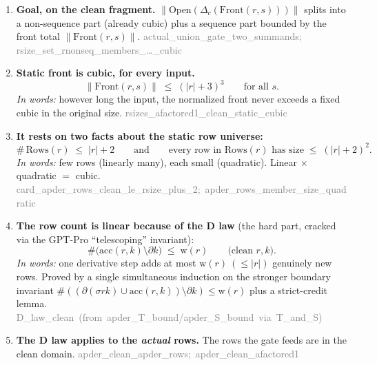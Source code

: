 \documentclass[11pt]{article}
\newcommand{\rs}[1]{\lvert #1\rvert}                  %
\newcommand{\norm}[1]{\lVert #1\rVert}                %
\newcommand{\acc}{\mathrm{acc}}                       %
\newcommand{\front}{\partial}                          %
\newcommand{\seqn}{\sigma}                             %
\newcommand{\zw}{\mathrm{w}}                           %
\newcommand{\Rows}{\mathrm{Rows}}                      %
\newcommand{\Front}{\mathrm{Front}}                    %
\newcommand{\Strong}{\Delta}                           %
\newcommand{\Open}{\mathrm{Open}}                      %
\newcommand{\done}{\textcolor{green!55!black}{\textbf{[\checkmark\ PROVEN]}}}
\newcommand{\lem}[1]{{\footnotesize\textsf{\textcolor{gray}{#1}}}}
\begin{document}
\medskip
\begin{enumerate}[leftmargin=2.2em,itemsep=6pt]

\item[\done] \textbf{Goal, on the clean fragment.}
$\norm{\Open(\Strong_c(\Front(r,s)))}$ splits into a non-sequence part
(already cubic) plus a sequence part bounded by the front total $\norm{\Front(r,s)}$.
\lem{actual\_union\_gate\_two\_summands; rsize\_set\_rnonseq\_members\_\dots\_cubic}

\item[\done] \textbf{Static front is cubic, for every input.}
\[
\norm{\Front(r,s)}\;\le\;(\rs{r}+3)^3\qquad\text{for all }s.
\]
\emph{In words:} however long the input, the normalized front never exceeds a
fixed cubic in the original size.
\lem{rsizes\_afactored1\_clean\_static\_cubic}

\item[\done] \textbf{It rests on two facts about the static row universe:}
\[
\#\,\Rows(r)\;\le\;\rs{r}+2
\qquad\text{and}\qquad
\text{every row in }\Rows(r)\text{ has size}\;\le\;(\rs{r}+2)^2 .
\]
\emph{In words:} few rows (linearly many), each small (quadratic). Linear
$\times$ quadratic $=$ cubic.
\lem{card\_apder\_rows\_clean\_le\_rsize\_plus\_2;\ apder\_rows\_member\_size\_quadratic}

\item[\done] \textbf{The row count is linear because of the D law} (the hard part,
cracked via the GPT-Pro ``telescoping'' invariant):
\[
\#\bigl(\acc(r,k)\setminus\front k\bigr)\;\le\;\zw(r)
\qquad\text{(clean }r,k\text{).}
\]
\emph{In words:} one derivative step adds at most $\zw(r)\ (\le\rs{r})$ genuinely
new rows. Proved by a single simultaneous induction on the stronger boundary
invariant $\#((\front(\seqn r k)\cup\acc(r,k))\setminus\front k)\le\zw(r)$ plus a
strict-credit lemma.
\lem{D\_law\_clean\ (from\ apder\_T\_bound/apder\_S\_bound\ via\ T\_and\_S)}

\item[\done] \textbf{The D law applies to the \emph{actual} rows.}
The rows the gate feeds are in the clean domain.
\lem{apder\_clean\_apder\_rows;\ apder\_clean\_afactored1}


\end{enumerate}
\end{document}
